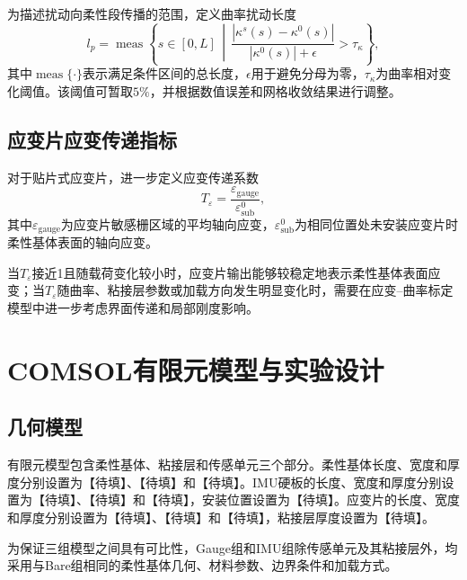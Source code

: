 为描述扰动向柔性段传播的范围，定义曲率扰动长度
\begin{equation}
    l_p
    =
    \operatorname{meas}
    \left\{
    s\in[0,L]
    \,\middle|\,
    \frac{
    \left|
    \kappa^{s}(s)-\kappa^{0}(s)
    \right|
    }{
    \left|\kappa^{0}(s)\right|+\epsilon
    }
    >
    \tau_{\kappa}
    \right\},
    \label{eq:curvature_perturbation_length}
\end{equation}
其中$\operatorname{meas}\{\cdot\}$表示满足条件区间的总长度，$\epsilon$用于避免分母为零，$\tau_{\kappa}$为曲率相对变化阈值。该阈值可暂取$5\%$，并根据数值误差和网格收敛结果进行调整。


\subsection{应变片应变传递指标}

对于贴片式应变片，进一步定义应变传递系数
\begin{equation}
    T_{\varepsilon}
    =
    \frac{
    \varepsilon_{\mathrm{gauge}}
    }{
    \varepsilon_{\mathrm{sub}}^{0}
    },
    \label{eq:strain_transfer_ratio}
\end{equation}
其中$\varepsilon_{\mathrm{gauge}}$为应变片敏感栅区域的平均轴向应变，$\varepsilon_{\mathrm{sub}}^{0}$为相同位置处未安装应变片时柔性基体表面的轴向应变。

当$T_{\varepsilon}$接近1且随载荷变化较小时，应变片输出能够较稳定地表示柔性基体表面应变；当$T_{\varepsilon}$随曲率、粘接层参数或加载方向发生明显变化时，需要在应变--曲率标定模型中进一步考虑界面传递和局部刚度影响。


\section{COMSOL有限元模型与实验设计}
\label{sec:comsol_model_design}

\subsection{几何模型}

有限元模型包含柔性基体、粘接层和传感单元三个部分。柔性基体长度、宽度和厚度分别设置为【待填】、【待填】和【待填】。IMU硬板的长度、宽度和厚度分别设置为【待填】、【待填】和【待填】，安装位置设置为【待填】。应变片的长度、宽度和厚度分别设置为【待填】、【待填】和【待填】，粘接层厚度设置为【待填】。

为保证三组模型之间具有可比性，Gauge组和IMU组除传感单元及其粘接层外，均采用与Bare组相同的柔性基体几何、材料参数、边界条件和加载方式。


